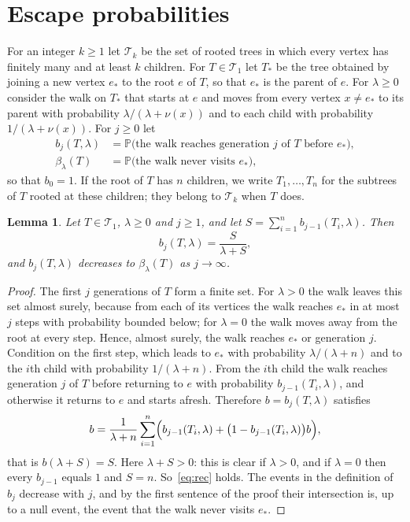 \documentclass[11pt]{amsart}
\newtheorem{lemma}[theorem]{Lemma}
\theoremstyle{definition}
\newcommand{\Prob}{\mathbb{P}}
\newcommand{\cT}{\mathcal{T}}
\begin{document}
\section{Escape probabilities}\label{sec:escape}

For an integer $k\ge1$ let $\cT_k$ be the set of rooted trees in which every vertex has finitely many and at
least $k$ children. For $T\in\cT_1$ let $T_*$ be the tree obtained by joining a new vertex $e_*$ to the root $e$
of $T$, so that $e_*$ is the parent of $e$. For $\lambda\ge0$ consider the walk on $T_*$ that starts at $e$ and
moves from every vertex $x\ne e_*$ to its parent with probability $\lambda/(\lambda+\nu(x))$ and to each child
with probability $1/(\lambda+\nu(x))$. For $j\ge0$ let
\begin{align*}
   b_j(T,\lambda)&=\Prob\bigl(\text{the walk reaches generation $j$ of $T$ before $e_*$}\bigr),\\
   \beta_\lambda(T)&=\Prob\bigl(\text{the walk never visits $e_*$}\bigr),
\end{align*}
so that $b_0=1$. If the root of $T$ has $n$ children, we write $T_1,\dots,T_n$ for the subtrees of $T$ rooted at
these children; they belong to $\cT_k$ when $T$ does.

\begin{lemma}\label{lem:rec}
Let $T\in\cT_1$, $\lambda\ge0$ and $j\ge1$, and let $S=\sum_{i=1}^n b_{j-1}(T_i,\lambda)$. Then
\begin{equation}\label{eq:rec}
   b_j(T,\lambda)=\frac{S}{\lambda+S},
\end{equation}
and $b_j(T,\lambda)$ decreases to $\beta_\lambda(T)$ as $j\to\infty$.
\end{lemma}

\begin{proof}
The first $j$ generations of $T$ form a finite set. For $\lambda>0$ the walk leaves this set almost surely,
because from each of its vertices the walk reaches $e_*$ in at most $j$ steps with probability bounded below;
for $\lambda=0$ the walk moves away from the root at every step. Hence, almost surely, the walk reaches $e_*$ or
generation $j$. Condition on the first step, which leads to $e_*$ with probability $\lambda/(\lambda+n)$ and to
the $i$th child with probability $1/(\lambda+n)$. From the $i$th child the walk reaches generation $j$ of $T$
before returning to $e$ with probability $b_{j-1}(T_i,\lambda)$, and otherwise it returns to $e$ and starts
afresh. Therefore $b=b_j(T,\lambda)$ satisfies
\[
   b=\frac1{\lambda+n}\sum_{i=1}^n\Bigl(b_{j-1}(T_i,\lambda)+\bigl(1-b_{j-1}(T_i,\lambda)\bigr)b\Bigr),
\]
that is $b(\lambda+S)=S$. Here $\lambda+S>0$: this is clear if $\lambda>0$, and if $\lambda=0$ then every
$b_{j-1}$ equals $1$ and $S=n$. So~\eqref{eq:rec} holds. The events in the definition of $b_j$ decrease with $j$, and
by the first sentence of the proof their intersection is, up to a null event, the event that the walk never
visits $e_*$.
\end{proof}
\end{document}
